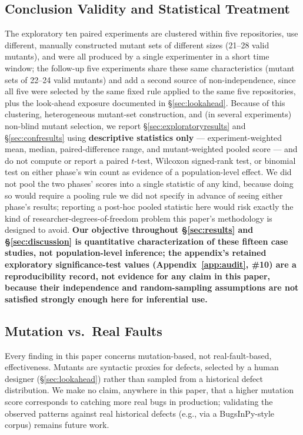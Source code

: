 \documentclass[10pt,conference]{IEEEtran}
\begin{document}
\subsection{Conclusion Validity and Statistical Treatment}
\label{sec:threatsconclusionvalidity}
The exploratory ten paired experiments are clustered within five repositories, use different, manually constructed mutant sets of different sizes (21--28 valid mutants), and were all produced by a single experimenter in a short time window; the follow-up five experiments share these same characteristics (mutant sets of 22--24 valid mutants) and add a second source of non-independence, since all five were selected by the same fixed rule applied to the same five repositories, plus the look-ahead exposure documented in \S\ref{sec:lookahead}. Because of this clustering, heterogeneous mutant-set construction, and (in several experiments) non-blind mutant selection, we report \S\ref{sec:exploratoryresults} and \S\ref{sec:confresults} using \textbf{descriptive statistics only} — experiment-weighted mean, median, paired-difference range, and mutant-weighted pooled score — and do not compute or report a paired $t$-test, Wilcoxon signed-rank test, or binomial test on either phase's win count as evidence of a population-level effect. We did not pool the two phases' scores into a single statistic of any kind, because doing so would require a pooling rule we did not specify in advance of seeing either phase's results; reporting a post-hoc pooled statistic here would risk exactly the kind of researcher-degrees-of-freedom problem this paper's methodology is designed to avoid. \textbf{Our objective throughout \S\ref{sec:results} and \S\ref{sec:discussion} is quantitative characterization of these fifteen case studies, not population-level inference; the appendix's retained exploratory significance-test values (Appendix~\ref{app:audit}, \#10) are a reproducibility record, not evidence for any claim in this paper, because their independence and random-sampling assumptions are not satisfied strongly enough here for inferential use.}

\subsection{Mutation vs.\ Real Faults}
\label{sec:realfaults}
Every finding in this paper concerns mutation-based, not real-fault-based, effectiveness. Mutants are syntactic proxies for defects, selected by a human designer (\S\ref{sec:lookahead}) rather than sampled from a historical defect distribution. We make no claim, anywhere in this paper, that a higher mutation score corresponds to catching more real bugs in production; validating the observed patterns against real historical defects (e.g., via a BugsInPy-style corpus) remains future work.
\end{document}
